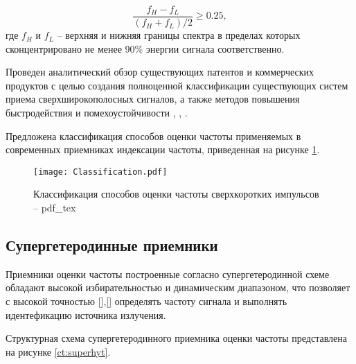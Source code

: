 \begin{equation*}
\frac{f_H - f_L}{(f_H + f_L)/2} \geqslant 0.25 ,
\label{eq:ubw_condition}
\end{equation*}
где \(f_H\) и \(f_L\) -- верхняя и нижняя границы спектра в пределах которых сконцентрировано не менее 90\% энергии сигнала соответственно.


Проведен аналитический обзор существующих патентов и коммерческих продуктов с целью создания полноценной классификации существующих систем приема сверхширокополосных сигналов, а также методов повышения быстродействия и помехоустойчивости \cite{jia_4-bit_2020}, \cite{cheng_introduction_2021, lin_60-ghz_nodate, gray_analysis_2009}, \cite{nagulu_ultra-wideband_2021, rahimpour_design_2019, rucker_013m_2009, pelgrom_matching_1989-1, du_112-gss_2019, hartmann_low-power_2007, saha_6-20_2012, johansen_analysis_2005, shahramian_millimeter-wave_2011, du_256-gss_2018, dyskin_wideband_2016, noauthor_photonic_nodate, noauthor_microwave_2005}.

Предложена классификация способов оценки частоты применяемых в современных приемниках индексации частоты, приведенная на рисунке \ref{ct:classification}.

\begin{figure}[ht]
	\centering
	\texttt{[image: Classification.pdf]}	
	\caption{Классификация способов оценки частоты сверхкоротких импульсов -- pdf\_tex}
	\label{ct:classification}
\end{figure}

\subsection{Супергетеродинные приемники}
Приемники оценки частоты построенные согласно супергетеродинной схеме обладают высокой избирательностью и динамическим диапазоном, что позволяет с высокой точностью [],[] определять частоту сигнала и выполнять идентефикацию источника излучения.

Структурная схема супергетеродинного приемника оценки частоты представлена на рисунке \ref{ct:superhyt}.

